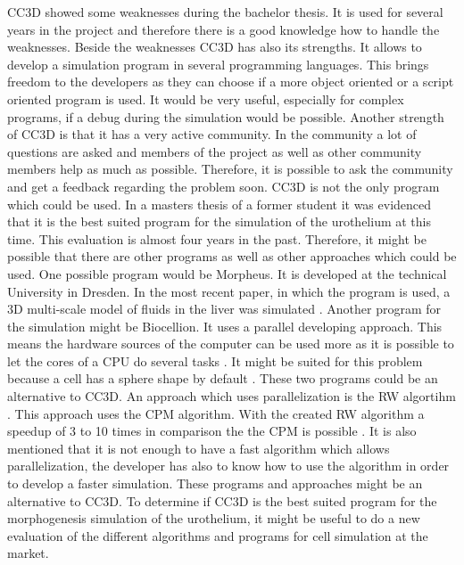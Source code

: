 \ac{CC3D} showed some weaknesses during the bachelor thesis. It is used for several years in the project and therefore there is a good knowledge how to handle the weaknesses. Beside the weaknesses \ac{CC3D} has also its strengths. It allows to develop a simulation program in several programming languages.  This brings freedom to the developers as they can choose if a more object oriented or a script oriented program is used. It would be very useful, especially for complex programs, if a debug during the simulation would be possible. Another strength of \ac{CC3D} is that it has a very active community. In the community a lot of questions are asked and members of the project as well as other community members help as much as possible. Therefore, it is possible to ask the community and get a feedback regarding the problem soon. \newline
\ac{CC3D} is not the only program which could be used. In a masters thesis of a former student it was evidenced that it is the best suited program for the simulation of the urothelium \cite{MSCAngelo} at this time. This evaluation is almost four years in the past. Therefore, it might be possible that there are other programs as well as other approaches which could be used. One possible program would be Morpheus. It is developed at the technical University in Dresden. In the most recent paper, in which the program is used, a 3D multi-scale model of fluids in the liver was simulated \cite{Meyer2017}. Another program for the simulation might be Biocellion. It uses a parallel developing approach. This means the hardware sources of the computer can be used more as it is possible to let the cores of a CPU do several tasks \cite{Kang2014}. It might be suited for this problem because a cell has a sphere shape by default \cite{Kang2014}. These two programs could be an alternative to \ac{CC3D}. \newline
An approach which uses parallelization is the \ac{RW} algortihm \cite{Cercato2006}. This approach uses the \ac{CPM} algorithm. With the created \ac{RW} algorithm a speedup of 3 to 10 times in comparison the the \ac{CPM} is possible \cite{Cercato2006}. It is also mentioned that it is not enough to have a fast algorithm which allows parallelization, the developer has also to know how to use the algorithm in order to develop a faster simulation. \newline
These programs and approaches might be an alternative to \ac{CC3D}. To determine if \ac{CC3D} is the best suited program for the morphogenesis simulation of the urothelium, it might be useful to do a new evaluation of the different algorithms and programs for cell simulation at the market.


